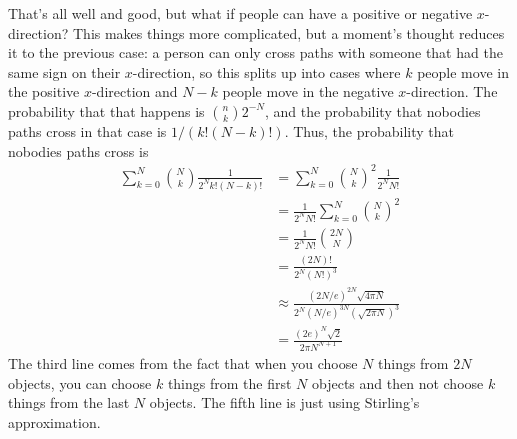 \documentclass[11pt]{article}
\theoremstyle{definition}
\begin{document}
That's all well and good, but what if people can have a positive or negative $x$-direction?  This makes things more complicated, but a moment's thought reduces it to the previous case: a person can only cross paths with someone that had the same sign on their $x$-direction, so this splits up into cases where $k$ people move in the positive $x$-direction and $N-k$ people move in the negative $x$-direction.  The probability that that happens is $\binom{n}{k}2^{-N}$, and the probability that nobodies paths cross in that case is $1/(k!(N-k)!)$.  Thus, the probability that nobodies paths cross is
\begin{align*}
\sum_{k=0}^N \binom{N}{k}\frac{1}{2^Nk!(N-k)!} & = \sum_{k=0}^{N} \binom{N}{k}^2\frac{1}{2^NN!} \\
& = \frac{1}{2^NN!} \sum_{k=0}^N \binom{N}{k}^2 \\
& = \frac{1}{2^NN!} \binom{2N}{N} \\
& = \frac{(2N)!}{2^N(N!)^3} \\
& \approx \frac{(2N/e)^{2N} \sqrt{4\pi N}}{2^N(N/e)^{3N}(\sqrt{2\pi N})^3} \\
& = \frac{(2e)^N\sqrt{2}}{2\pi N^{N+1}}
\end{align*}
The third line comes from the fact that when you choose $N$ things from $2N$ objects, you can choose $k$ things from the first $N$ objects and then not choose $k$ things from the last $N$ objects.  The fifth line is just using Stirling's approximation.
\end{document}
